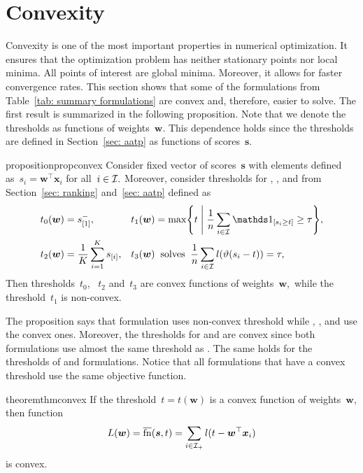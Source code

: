 \section{Convexity}\label{sec: convexity}

Convexity is one of the most important properties in numerical optimization. It ensures that the optimization problem has neither stationary points nor local minima. All points of interest are global minima. Moreover, it allows for faster convergence rates. This section shows that some of the formulations from Table~\ref{tab: summary formulations} are convex and, therefore, easier to solve. The first result is summarized in the following proposition. Note that we denote the thresholds as functions of weights~$\bm{w}.$ This dependence holds since the thresholds are defined in Section~\ref{sec: aatp} as functions of scores~$\bm{s}.$

\begin{restatable}{proposition}{propconvex}\label{prop: convexity}
  Consider fixed vector of scores~$\bm{s}$ with elements defined as~$s_i = \bm{w}^{\top} \bm{x}_i$ for all~$i \in \mathcal{I}.$ Moreover, consider thresholds for \TopPush, \Grill, \TopMeanK and \PatMat from Section~\ref{sec: ranking} and~\ref{sec: aatp} defined as
  \begin{align*}
    t_0(\bm{w}) &
      = s_{[1]}^-, &
    t_1(\bm{w}) &
      = \max \Set{t}{\frac{1}{\nall} \sum_{i \in \I} \Iverson{s_i \geq t} \geq \tau}, \\
    t_2(\bm{w}) &
      = \frac{1}{K} \sum_{i=1}^{K} s_{[i]}, &
    t_3(\bm{w}) &
      \;\; \text{solves} \;\; \frac{1}{\nall} \sum_{i \in \I} l\Brac{\vartheta(s_i - t)} = \tau,
  \end{align*}
  Then thresholds~$t_0$, ~$t_2$ and~$t_3$ are convex functions of weights~$\bm{w},$ while the threshold~$t_1$ is non-convex.
\end{restatable}

The proposition says that \Grill formulation uses non-convex threshold while \TopPush, \TopMeanK, and \PatMat use the convex ones. Moreover, the thresholds for \tauFPL and \TopPushK are convex since both formulations use almost the same threshold as \TopMeanK. The same holds for the thresholds of \PatMat and \PatMatNP formulations. Notice that all formulations that have a convex threshold use the same objective function.

\begin{restatable}{theorem}{thmconvex}\label{thm: convexity}
  If the threshold~$t = t(\bm{w})$ is a convex function of weights~$\bm{w}$, then function
  \begin{equation*}
    L(\bm{w}) = \operatorname{\overline{fn}}(\bm{s}, t) = \sum_{i \in \mathcal{I}_{+}}l(t - \bm{w}^{\top} \bm{x}_i)
  \end{equation*}
  is convex.
\end{restatable}

